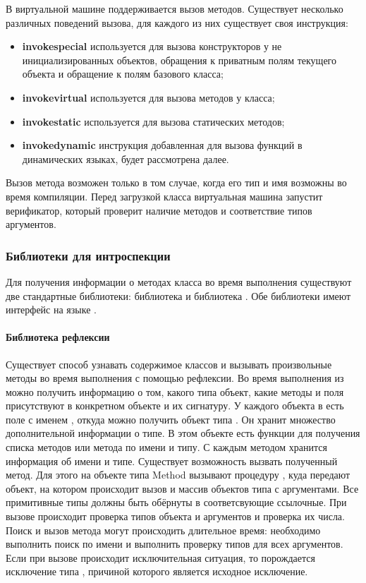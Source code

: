 В виртуальной машине поддерживается вызов методов. Существует несколько различных поведений вызова, для каждого из них существует своя инструкция:
\begin{itemize}
    \item \textbf{invokespecial} используется для вызова конструкторов у не инициализированных объектов, обращения к приватным полям текущего объекта и обращение к полям базового класса;
    \item \textbf{invokevirtual} используется для вызова методов у класса;
    \item \textbf{invokestatic} используется для вызова статических методов;
    \item \textbf{invokedynamic} инструкция добавленная для вызова функций в динамических языках, будет рассмотрена далее.
\end{itemize}

Вызов метода возможен только в том случае, когда его тип и имя возможны во время компиляции. Перед загрузкой класса виртуальная машина запустит верификатор, который проверит наличие методов и соответствие типов аргументов.

\subsubsection{Библиотеки для интроспекции}
Для получения информации о методах класса во время выполнения существуют две стандартные библиотеки: библиотека  и библиотека . Обе библиотеки имеют интерфейс на языке .

\paragraph{Библиотека рефлексии}
Существует способ узнавать содержимое классов и вызывать произвольные методы во время выполнения с помощью рефлексии\cite{jvm:reflection}. Во время выполнения из  можно получить информацию о том, какого типа объект, какие методы и поля присутствуют в конкретном объекте и их сигнатуру. У каждого объекта в  есть поле с именем , откуда можно получить объект типа . Он хранит множество дополнительной информации о типе. В этом объекте есть функции для получения списка методов или метода по имени и типу. С каждым методом хранится информация об имени и типе. Существует возможность вызвать полученный метод. Для этого на объекте типа Method вызывают процедуру , куда передают объект, на котором происходит вызов и массив объектов типа  с аргументами. Все примитивные типы должны быть обёрнуты в соответсвующие ссылочные. При вызове происходит проверка типов объекта и аргументов и проверка их числа. Поиск и вызов метода могут происходить длительное время: необходимо выполнить поиск по имени и выполнить проверку типов для всех аргументов. Если при вызове происходит исключительная ситуация, то порождается исключение типа , причиной которого является исходное исключение.

